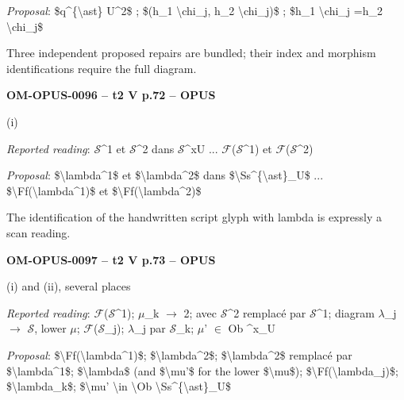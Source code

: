 \emph{Proposal}: \$q\textasciicircum{}\{\textbackslash{}ast\} U\textasciicircum{}2\$ ; \$(h\_1 \textbackslash{}chi\_j, h\_2 \textbackslash{}chi\_j)\$ ; \$h\_1 \textbackslash{}chi\_j =\allowbreak  h\_2 \textbackslash{}chi\_j\$\par
Three independent proposed repairs are bundled; their index and morphism identifications require the full diagram.\par
\par\noindent\textbf{OM-OPUS-0096 -- t2 V p.72 -- OPUS}\par
(i)\par
\emph{Reported reading}: \ensuremath{𝒮}\textasciicircum{}1 et \ensuremath{𝒮}\textasciicircum{}2 dans \ensuremath{𝒮}\textasciicircum{}xU ... \ensuremath{\mathcal{F}}(\ensuremath{𝒮}\textasciicircum{}1) et \ensuremath{\mathcal{F}}(\ensuremath{𝒮}\textasciicircum{}2)\par
\emph{Proposal}: \$\textbackslash{}lambda\textasciicircum{}1\$ et \$\textbackslash{}lambda\textasciicircum{}2\$ dans \$\textbackslash{}Ss\textasciicircum{}\{\textbackslash{}ast\}\_U\$ ... \$\textbackslash{}Ff(\textbackslash{}lambda\textasciicircum{}1)\$ et \$\textbackslash{}Ff(\textbackslash{}lambda\textasciicircum{}2)\$\par
The identification of the handwritten script glyph with lambda is expressly a scan reading.\par
\par\noindent\textbf{OM-OPUS-0097 -- t2 V p.73 -- OPUS}\par
(i) and (ii), several places\par
\emph{Reported reading}: \ensuremath{\mathcal{F}}(\ensuremath{𝒮}\textasciicircum{}1); \ensuremath{\mu}\_k \ensuremath{\to} 2; avec \ensuremath{𝒮}\textasciicircum{}2 remplacé par \ensuremath{𝒮}\textasciicircum{}1; diagram \ensuremath{\lambda}\_j \ensuremath{\to} \ensuremath{𝒮}, lower \ensuremath{\mu}; \ensuremath{\mathcal{F}}(\ensuremath{𝒮}\_j); \ensuremath{\lambda}\_j par \ensuremath{𝒮}\_k; \ensuremath{\mu}' \ensuremath{\in} Ob \textasciicircum{}x\_U\par
\emph{Proposal}: \$\textbackslash{}Ff(\textbackslash{}lambda\textasciicircum{}1)\$; \$\textbackslash{}lambda\textasciicircum{}2\$; \$\textbackslash{}lambda\textasciicircum{}2\$ remplacé par \$\textbackslash{}lambda\textasciicircum{}1\$; \$\textbackslash{}lambda\$ (and \$\textbackslash{}mu'\$ for the lower \$\textbackslash{}mu\$); \$\textbackslash{}Ff(\textbackslash{}lambda\_j)\$; \$\textbackslash{}lambda\_k\$; \$\textbackslash{}mu' \textbackslash{}in \textbackslash{}Ob \textbackslash{}Ss\textasciicircum{}\{\textbackslash{}ast\}\_U\$\par
